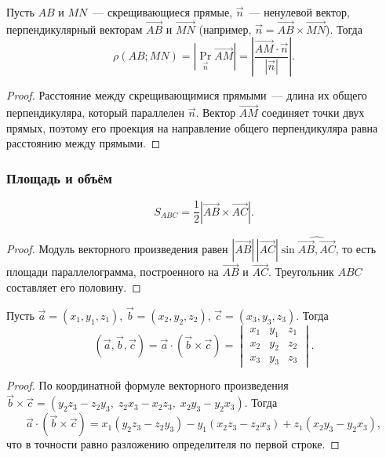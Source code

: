 \documentclass[12pt]{article}
\begin{document}
    \begin{statement}
    	Пусть $AB$ и $MN$~--- скрещивающиеся прямые, $\vec{n}$~--- ненулевой вектор, перпендикулярный векторам $\vec{AB}$ и $\vec{MN}$ (например, $\vec{n} = \vec{AB} \times \vec{MN}$). Тогда
    	\[
    		\rho(AB; MN) = \left| \operatorname{Pr}_{\vec{n}} \vec{AM} \right| = \left| \dfrac{\vec{AM} \cdot \vec{n}}{|\vec{n}|} \right|.
    	\]
    \end{statement}
    
    \begin{proof}
    	Расстояние между скрещивающимися прямыми~--- длина их общего перпендикуляра, который параллелен $\vec{n}$. Вектор $\vec{AM}$ соединяет точки двух прямых, поэтому его проекция на направление общего перпендикуляра равна расстоянию между прямыми.
    \end{proof}
    
    \subsubsection{Площадь и объём}
    
    \begin{statement}
    	\[
    		S_{ABC} = \dfrac{1}{2} \left| \vec{AB} \times \vec{AC} \right|.
    	\]
    \end{statement}
    
    \begin{proof}
    	Модуль векторного произведения равен $|\vec{AB}| \, |\vec{AC}| \sin \widehat{\vec{AB}, \vec{AC}}$, то есть площади параллелограмма, построенного на $\vec{AB}$ и $\vec{AC}$. Треугольник $ABC$ составляет его половину.
    \end{proof}
    
    \begin{statement}
    	Пусть $\vec{a} = (x_1, y_1, z_1)$, $\vec{b} = (x_2, y_2, z_2)$, $\vec{c} = (x_3, y_3, z_3)$. Тогда
    	\[
    		(\vec{a}, \vec{b}, \vec{c}) = \vec{a} \cdot (\vec{b} \times \vec{c}) = \begin{vmatrix}
    			x_1 & y_1 & z_1 \\
    			x_2 & y_2 & z_2 \\
    			x_3 & y_3 & z_3
    		\end{vmatrix}.
    	\]
    \end{statement}
    
    \begin{proof}
    	По координатной формуле векторного произведения $\vec{b} \times \vec{c} = (y_2z_3 - z_2y_3, \; z_2x_3 - x_2z_3, \; x_2y_3 - y_2x_3)$. Тогда
    	\[
    		\vec{a} \cdot (\vec{b} \times \vec{c}) = x_1 (y_2z_3 - z_2y_3) - y_1 (x_2z_3 - z_2x_3) + z_1 (x_2y_3 - y_2x_3),
    	\]
    	что в точности равно разложению определителя по первой строке.
    \end{proof}
    
\end{document}
